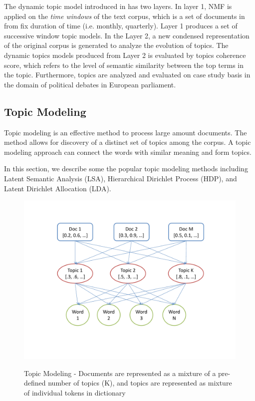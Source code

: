 The dynamic topic model introduced in \cite{Greene2016} has two layers. In layer 1,  NMF is applied on the \textit{time windows} of the text corpus, which is a set of documents in from fix duration of time (i.e. monthly, quarterly).  Layer 1 produces a set of successive window topic models. In the Layer 2, a new condensed representation of the original corpus is generated to analyze the evolution of topics. The dynamic topics models produced from Layer 2 is evaluated by topics coherence score, which refers to the level of semantic similarity between the top terms in the topic. Furthermore, topics are analyzed and evaluated on case study basis in the domain of political debates in European parliament. 





\subsection{Topic Modeling}
Topic modeling is an effective method to process large amount documents. The method allows for discovery of a distinct set of topics among the corpus. A topic modeling approach can connect the words with similar meaning and form topics. 


In this section, we describe some the popular topic modeling methods including Latent Semantic Analysis (LSA),  Hierarchical Dirichlet Process (HDP), and Latent Dirichlet Allocation (LDA). 



\begin{figure}[t]
\caption{Topic Modeling - Documents are represented as a mixture of a pre-defined number of topics (K), and topics are represented as mixture of individual tokens in dictionary}
\includegraphics[scale=.5]{img/topicmodeling.pdf}
\centering
\label{fig:topicmodel}
\end{figure}

